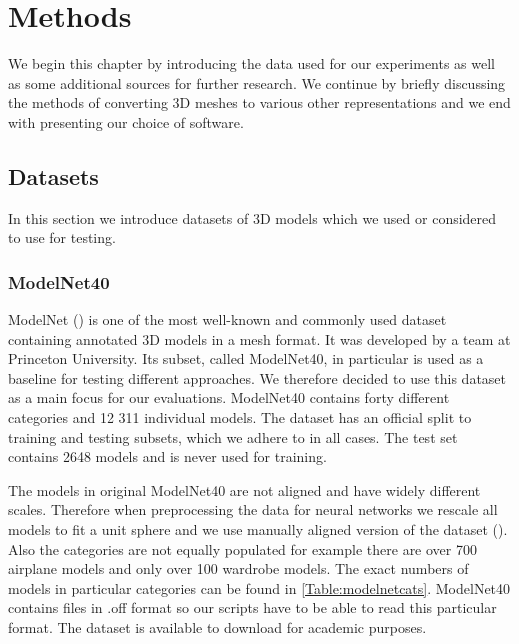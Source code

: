 \chapter{Methods}
\label{sec:chap4}
We begin this chapter by introducing the data used for our experiments as well as some additional sources for further research. We continue by briefly discussing the methods of converting 3D meshes to various other representations and we end with presenting our choice of software.

\section{Datasets}
\label{sec:dataset}
In this section we introduce datasets of 3D models which we used or considered to use for testing.

\subsection{ModelNet40}
\label{sec:modelnet}
ModelNet (\cite{wu_3d_2014}) is one of the most well-known and commonly used dataset containing annotated 3D models in a mesh format. It was developed by a team at Princeton University. Its subset, called ModelNet40, in particular is used as a baseline for testing different approaches. We therefore decided to use this dataset as a main focus for our evaluations. ModelNet40 contains forty different categories and 12 311 individual models. The dataset has an official split to training and testing subsets, which we adhere to in all cases. The test set contains 2648 models and is never used for training. \par



The models in original ModelNet40 are not aligned and have widely different scales. Therefore when preprocessing the data for neural networks we rescale all models to fit a  unit sphere and we use manually aligned version of the dataset (\cite{sedaghat_orientation-boosted_2016}). Also the categories are not equally populated for example there are over 700 airplane models and only over 100 wardrobe models. The exact numbers of models in particular categories can be found in \autoref{Table:modelnetcats}. ModelNet40 contains files in .off format so our scripts have to be able to read this particular format. The dataset is available to download for academic purposes.




